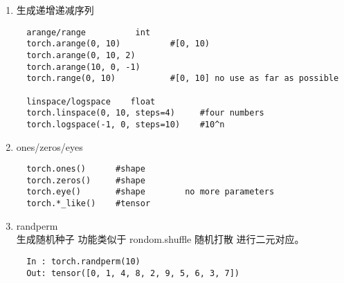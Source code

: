 \begin{enumerate}
  \item 生成递增递减序列
  \begin{lstlisting}
  arange/range          int
  torch.arange(0, 10)          #[0, 10)
  torch.arange(0, 10, 2)
  torch.arange(10, 0, -1)
  torch.range(0, 10)           #[0, 10] no use as far as possible

  linspace/logspace    float
  torch.linspace(0, 10, steps=4)     #four numbers
  torch.logspace(-1, 0, steps=10)    #10^n
  \end{lstlisting}

  \item ones/zeros/eyes
  \begin{lstlisting}
  torch.ones()      #shape
  torch.zeros()     #shape
  torch.eye()       #shape        no more parameters
  torch.*_like()    #tensor
  \end{lstlisting}

  \item randperm \\
  生成随机种子 功能类似于 rondom.shuffle 随机打散 进行二元对应。
  \begin{lstlisting}
  In : torch.randperm(10)
  Out: tensor([0, 1, 4, 8, 2, 9, 5, 6, 3, 7])
  \end{lstlisting}
\end{enumerate}


